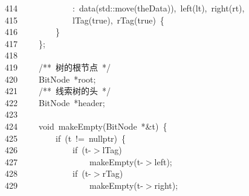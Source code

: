 \documentclass[11pt,a4paper]{ctexart}
\newcommand{\hlstd}[1]{\textcolor[rgb]{0.2,0.2,0.2}{#1}}
\newcommand{\hlcom}[1]{\textcolor[rgb]{0.59,0.59,0.59}{#1}}
\newcommand{\hlopt}[1]{\textcolor[rgb]{0.2,0.2,0.2}{#1}}
\newcommand{\hllin}[1]{\textcolor[rgb]{0.59,0.59,0.59}{#1}}
\newcommand{\hlkwa}[1]{\textcolor[rgb]{0.23,0.42,0.78}{#1}}
\newcommand{\hlkwb}[1]{\textcolor[rgb]{0.63,0,0.31}{#1}}
\newcommand{\hlkwc}[1]{\textcolor[rgb]{0,0.63,0.31}{#1}}
\newcommand{\hlkwd}[1]{\textcolor[rgb]{0.78,0.23,0.41}{#1}}
\begin{document}
\hllin{414\ }\hlstd{}\hlstd{\ \ \ \ \ \ \ \ \ \ \ \ }\hlstd{}\hlopt{:\ }\hlstd{}\hlkwd{data}\hlstd{}\hlopt{(}\hlstd{}\hlkwc{std}\hlstd{}\hlopt{::}\hlstd{}\hlkwd{move}\hlstd{}\hlopt{(}\hlstd{theData}\hlopt{)),\ }\hlstd{}\hlkwd{left}\hlstd{}\hlopt{(}\hlstd{lt}\hlopt{),\ }\hlstd{}\hlkwd{right}\hlstd{}\hlopt{(}\hlstd{rt}\hlopt{),\ }\Righttorque\\
\hllin{415\ }\hlstd{}\hlstd{\ \ \ \ \ \ \ \ \ \ \ \ }\hlstd{}\hlkwd{lTag}\hlstd{}\hlopt{(}\hlstd{}\hlkwa{true}\hlstd{}\hlopt{),\ }\hlstd{}\hlkwd{rTag}\hlstd{}\hlopt{(}\hlstd{}\hlkwa{true}\hlstd{}\hlopt{)\ \{}\\
\hllin{416\ }\hlstd{}\hlstd{\ \ \ \ \ \ \ \ }\hlstd{}\hlopt{\}}\\
\hllin{417\ }\hlstd{}\hlstd{\ \ \ \ }\hlstd{}\hlopt{\};}\\
\hllin{418\ }\hlstd{}\\
\hllin{419\ }\hlstd{}\hlstd{\ \ \ \ }\hlstd{}\hlcom{/{*}{*}\ 树的根节点\ {*}/}\hlstd{}\\
\hllin{420\ }\hlstd{}\hlstd{\ \ \ \ }\hlstd{BitNode\ }\hlopt{{*}}\hlstd{root}\hlopt{;}\\
\hllin{421\ }\hlstd{}\hlstd{\ \ \ \ }\hlstd{}\hlcom{/{*}{*}\ 线索树的头\ {*}/}\hlstd{}\\
\hllin{422\ }\hlstd{}\hlstd{\ \ \ \ }\hlstd{BitNode\ }\hlopt{{*}}\hlstd{header}\hlopt{;}\\
\hllin{423\ }\hlstd{}\\
\hllin{424\ }\hlstd{}\hlstd{\ \ \ \ }\hlstd{}\hlkwb{void\ }\hlstd{}\hlkwd{makeEmpty}\hlstd{}\hlopt{(}\hlstd{BitNode\ }\hlopt{{*}\&}\hlstd{t}\hlopt{)\ \{}\\
\hllin{425\ }\hlstd{}\hlstd{\ \ \ \ \ \ \ \ }\hlstd{}\hlkwa{if\ }\hlstd{}\hlopt{(}\hlstd{t\ }\hlopt{!=\ }\hlstd{}\hlkwc{nullptr}\hlstd{}\hlopt{)\ \{}\\
\hllin{426\ }\hlstd{}\hlstd{\ \ \ \ \ \ \ \ \ \ \ \ }\hlstd{}\hlkwa{if\ }\hlstd{}\hlopt{(}\hlstd{t}\hlopt{{-}$>$}\hlstd{lTag}\hlopt{)}\\
\hllin{427\ }\hlstd{}\hlstd{\ \ \ \ \ \ \ \ \ \ \ \ \ \ \ \ }\hlstd{}\hlkwd{makeEmpty}\hlstd{}\hlopt{(}\hlstd{t}\hlopt{{-}$>$}\hlstd{left}\hlopt{);}\\
\hllin{428\ }\hlstd{}\hlstd{\ \ \ \ \ \ \ \ \ \ \ \ }\hlstd{}\hlkwa{if\ }\hlstd{}\hlopt{(}\hlstd{t}\hlopt{{-}$>$}\hlstd{rTag}\hlopt{)}\\
\hllin{429\ }\hlstd{}\hlstd{\ \ \ \ \ \ \ \ \ \ \ \ \ \ \ \ }\hlstd{}\hlkwd{makeEmpty}\hlstd{}\hlopt{(}\hlstd{t}\hlopt{{-}$>$}\hlstd{right}\hlopt{);}\\
\end{document}
